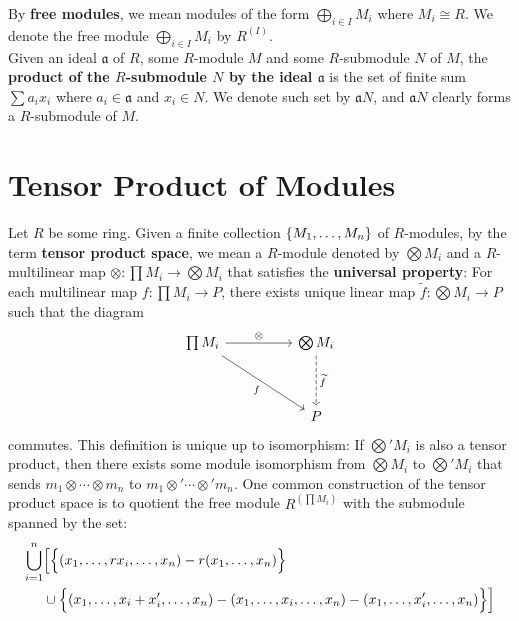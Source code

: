 \documentclass{report}
\begin{document}
By \textbf{free modules}, we mean modules of the form $\bigoplus_{i \in I}M_i$ where $M_i \cong R$. We denote the free module $\bigoplus_{i \in I}M_i$ by $R^{(I)}$. \\




Given an ideal $\mathfrak{a}$ of $R$, some  $R$-module $M$ and some  $R$-submodule  $N$ of  $M$, the \textbf{product of the $R$-submodule $N$  by the ideal $\mathfrak{a}$}  is the set of finite sum $\sum a_i x_i$ where $a_i \in \mathfrak{a}$ and $x_i \in N$. We denote such set by  $\mathfrak{a}N$, and $\mathfrak{a}N$ clearly forms a $R$-submodule of $M$. \\
\section{Tensor Product of Modules}
Let $R$ be some ring. Given a finite collection $\{ M_1,\dots ,M_n \}$ of $R$-modules, by the term \textbf{tensor product space}, we mean a $R$-module denoted by $\bigotimes M_i$ and a $R$-multilinear map $\otimes : \prod M_i \rightarrow \bigotimes M_i$ that satisfies the \textbf{universal property}: For each multilinear map $f:\prod M_i \rightarrow P$, there exists unique linear map $\tilde{f}:\bigotimes M_i \rightarrow P$ such that the diagram 
\[\begin{tikzcd}
	{\prod M_i} && {\bigotimes   M_i} \\
	\\
	&& P 
	\arrow["\otimes ", from=1-1, to=1-3]
	\arrow["f"', from=1-1, to=3-3]
	\arrow["\tilde{f} ", dashed, from=1-3, to=3-3]
\end{tikzcd}\]
commutes. This definition is unique up to isomorphism: If $\bigotimes 'M_i$ is also a tensor product, then there exists some module isomorphism from $\bigotimes  M_i$ to $\bigotimes  'M_i$ that sends $m_1 \otimes  \cdots \otimes  m_n$ to $m_1 \otimes  ' \cdots \otimes  ' m_n$. One common construction of the tensor product space is to quotient the free module $R^{(\prod M_i)}$ with the submodule spanned by the set:
\begin{align*}
  \bigcup_{i=1}^n &\Big[\Big\{ (x_1,\dots, rx_i ,\dots, x_n)-r(x_1,\dots ,x_n) \Big\}\\
 & \cup \Big\{ (x_1,\dots ,x_i +x_i',\dots  ,x_n)- (x_1,\dots ,x_i,\dots  ,x_n)-(x_1,\dots ,x_i',\dots ,x_n) \Big\}  \Big]
\end{align*}
\end{document}
